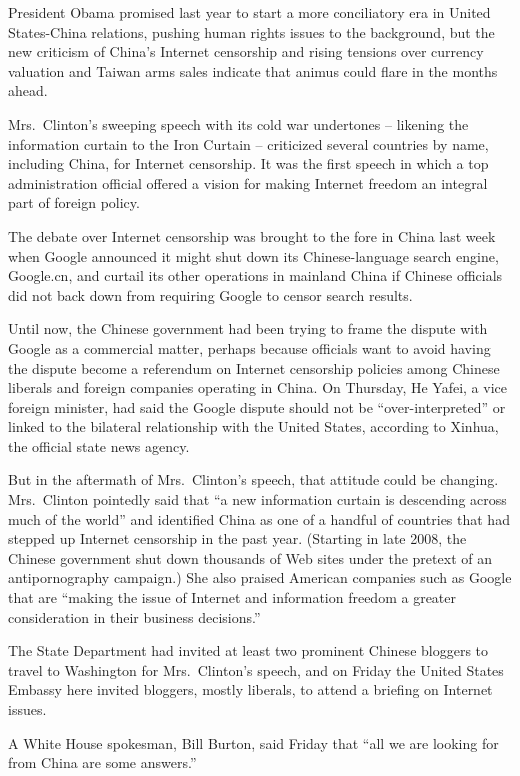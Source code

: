 ﻿\documentclass[12pt]{article}
\begin{document}
President Obama promised last year to start a more conciliatory era in United States-China
relations, pushing human rights issues to the background, but the new criticism of China's Internet
censorship and rising tensions over currency valuation and Taiwan arms sales indicate that animus
could flare in the months ahead.

Mrs.~Clinton's sweeping speech with its cold war undertones -- likening the information curtain to
the Iron Curtain -- criticized several countries by name, including China, for Internet censorship.
It was the first speech in which a top administration official offered a vision for making Internet
freedom an integral part of foreign policy.

The debate over Internet censorship was brought to the fore in China last week when Google announced
it might shut down its Chinese-language search engine, Google.cn, and curtail its other operations
in mainland China if Chinese officials did not back down from requiring Google to censor search
results.

Until now, the Chinese government had been trying to frame the dispute with Google as a commercial
matter, perhaps because officials want to avoid having the dispute become a referendum on Internet
censorship policies among Chinese liberals and foreign companies operating in China. On Thursday, He
Yafei, a vice foreign minister, had said the Google dispute should not be ``over-interpreted'' or
linked to the bilateral relationship with the United States, according to Xinhua, the official state
news agency.

But in the aftermath of Mrs.~Clinton's speech, that attitude could be changing. Mrs.~Clinton
pointedly said that ``a new information curtain is descending across much of the world'' and
identified China as one of a handful of countries that had stepped up Internet censorship in the
past year. (Starting in late 2008, the Chinese government shut down thousands of Web sites under the
pretext of an antipornography campaign.) She also praised American companies such as Google that are
``making the issue of Internet and information freedom a greater consideration in their business
decisions.''

The State Department had invited at least two prominent Chinese bloggers to travel to Washington for
Mrs.~Clinton's speech, and on Friday the United States Embassy here invited bloggers, mostly
liberals, to attend a briefing on Internet issues.

A White House spokesman, Bill Burton, said Friday that ``all we are looking for from China are some
answers.''
\end{document}
